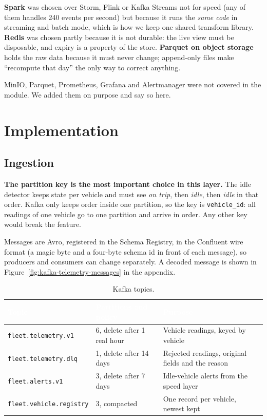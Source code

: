 \documentclass[11pt,a4paper]{article}
\newcommand{\hd}[1]{\textcolor{white}{\textbf{#1}}}
\begin{document}
\textbf{Spark} was chosen over Storm, Flink or Kafka Streams not for speed (any of them
handles 240 events per second) but because it runs the \emph{same code} in streaming and
batch mode, which is how we keep one shared transform library. \textbf{Redis} was chosen
partly because it is not durable: the live view must be disposable, and expiry is a
property of the store. \textbf{Parquet on object storage} holds the raw data because it
must never change; append-only files make ``recompute that day'' the only way to
correct anything.

MinIO, Parquet, Prometheus, Grafana and Alertmanager were not covered in the module.
We added them on purpose and say so here.

\section{Implementation}

\subsection{Ingestion}

\textbf{The partition key is the most important choice in this layer.} The idle
detector keeps state per vehicle and must see \emph{on trip}, then \emph{idle}, then
\emph{idle} in that order. Kafka only keeps order inside one partition, so the key is
\texttt{vehicle\_id}: all readings of one vehicle go to one partition and arrive in
order. Any other key would break the feature.

Messages are Avro, registered in the Schema Registry, in the Confluent wire format (a
magic byte and a four-byte schema id in front of each message), so producers and
consumers can change separately. A decoded message is shown in
Figure~\ref{fig:kafka-telemetry-messages} in the appendix.

\begin{table}[htbp]\centering\small
\begin{tabularx}{\linewidth}{|l|l|X|}
\hline
\rowcolor{tablehead}\hd{Topic} & \hd{Partitions and policy} & \hd{Purpose} \\ \hline
\texttt{fleet.telemetry.v1} & 6, delete after 1 real hour & Vehicle readings, keyed by vehicle \\ \hline
\texttt{fleet.telemetry.dlq} & 1, delete after 14 days & Rejected readings, original fields and the reason \\ \hline
\texttt{fleet.alerts.v1} & 3, delete after 7 days & Idle-vehicle alerts from the speed layer \\ \hline
\texttt{fleet.vehicle.registry} & 3, compacted & One record per vehicle, newest kept \\ \hline
\end{tabularx}
\caption{Kafka topics.}
\end{table}
\end{document}
